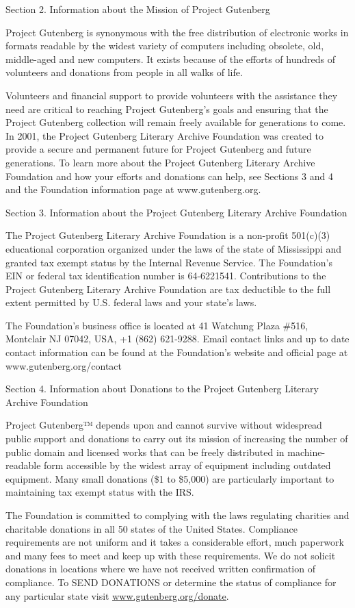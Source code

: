 \documentclass[11pt,openany,oneside]{book}
\begin{document}
Section 2. Information about the Mission of Project Gutenberg 

Project Gutenberg is synonymous with the free distribution of electronic works in formats readable by the widest variety of computers including obsolete, old, middle-aged and new computers. It exists because of the efforts of hundreds of volunteers and donations from people in all walks of life. 

Volunteers and financial support to provide volunteers with the assistance they need are critical to reaching Project Gutenberg’s goals and ensuring that the Project Gutenberg collection will remain freely available for generations to come. In 2001, the Project Gutenberg Literary Archive Foundation was created to provide a secure and permanent future for Project Gutenberg and future generations. To learn more about the Project Gutenberg Literary Archive Foundation and how your efforts and donations can help, see Sections 3 and 4 and the Foundation information page at www.gutenberg.org. 

Section 3. Information about the Project Gutenberg Literary Archive Foundation 

The Project Gutenberg Literary Archive Foundation is a non-profit 501(c)(3) educational corporation organized under the laws of the state of Mississippi and granted tax exempt status by the Internal Revenue Service. The Foundation’s EIN or federal tax identification number is 64-6221541. Contributions to the Project Gutenberg Literary Archive Foundation are tax deductible to the full extent permitted by U.S. federal laws and your state’s laws. 

The Foundation’s business office is located at 41 Watchung Plaza \#516, Montclair NJ 07042, USA, +1 (862) 621-9288. Email contact links and up to date contact information can be found at the Foundation’s website and official page at www.gutenberg.org/contact 

Section 4. Information about Donations to the Project Gutenberg Literary Archive Foundation 

Project Gutenberg™ depends upon and cannot survive without widespread public support and donations to carry out its mission of increasing the number of public domain and licensed works that can be freely distributed in machine-readable form accessible by the widest array of equipment including outdated equipment. Many small donations (\$1 to \$5,000) are particularly important to maintaining tax exempt status with the IRS. 

The Foundation is committed to complying with the laws regulating charities and charitable donations in all 50 states of the United States. Compliance requirements are not uniform and it takes a considerable effort, much paperwork and many fees to meet and keep up with these requirements. We do not solicit donations in locations where we have not received written confirmation of compliance. To SEND DONATIONS or determine the status of compliance for any particular state visit \href{https://www.gutenberg.org/donate/}{\uline{www.gutenberg.org/donate}}. 
\end{document}
